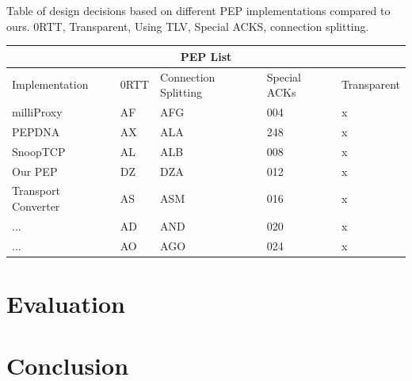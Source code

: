 \documentclass[a4paper,english, 11pt]{report}
\begin{document}
{Table of design decisions based on different PEP implementations compared to ours.}
{0RTT, Transparent, Using TLV, Special ACKS, connection splitting.}\\
\begin{tabular}{ |p{4cm}||p{2cm}|p{2cm}|p{2cm}|p{2cm}| }
 \hline
 \multicolumn{5}{|c|}{PEP List} \\
 \hline
 Implementation& 0RTT &Connection Splitting &Special ACKs &Transparent\\
 \hline
 milliProxy   & AF    &AFG&   004 & x\\
 PEPDNA&   AX  & ALA   &248 & x\\
 SnoopTCP &AL & ALB&  008 & x\\
 Our PEP    &DZ & DZA&  012& x \\
 Transport Converter &   AS  & ASM&016& x\\
 ...& AD  & AND   &020& x\\
 ...& AO  & AGO&024& x\\
 \hline
\end{tabular}

\chapter{Evaluation}
\chapter{Conclusion}

{}

\end{document}
